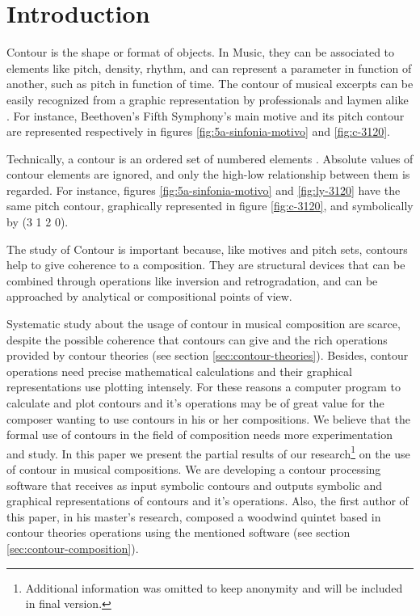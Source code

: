 

\section{Introduction}
\label{sec:introduction}
Contour is the shape or format of objects. In Music, they can be
associated to elements like pitch, density, rhythm, and can represent
a parameter in function of another, such as pitch in function of time.
The contour of musical excerpts can be easily recognized from a
graphic representation by professionals and laymen alike
\cite{marvin88:generalized}. For instance, Beethoven's Fifth
Symphony's main motive and its pitch contour are represented
respectively in figures \ref{fig:5a-sinfonia-motivo} and
\ref{fig:c-3120}.

Technically, a contour is an ordered set of numbered elements
\cite{morris93:directions}. Absolute values of contour elements are
ignored, and only the high-low relationship between them is
regarded. For instance, figures \ref{fig:5a-sinfonia-motivo} and
\ref{fig:ly-3120} have the same pitch contour, graphically represented
in figure \ref{fig:c-3120}, and symbolically by (3 1 2 0).

The study of Contour is important because, like motives and pitch
sets, contours help to give coherence to a composition. They are
structural devices that can be combined through operations like
inversion and retrogradation, and can be approached by analytical or
compositional points of view.

Systematic study about the usage of contour in musical composition are
scarce, despite the possible coherence that contours can give and the
rich operations provided by contour theories (see section
\ref{sec:contour-theories}). Besides, contour operations need precise
mathematical calculations and their graphical representations use
plotting intensely. For these reasons a computer program to calculate
and plot contours and it's operations may be of great value for the
composer wanting to use contours in his or her compositions. We
believe that the formal use of contours in the field of composition
needs more experimentation and study. In this paper we present the
partial results of our research\footnote{Additional information was
  omitted to keep anonymity and will be included in final version.} on
the use of contour in musical compositions. We are developing a
contour processing software that receives as input symbolic contours
and outputs symbolic and graphical representations of contours and
it's operations. Also, the first author of this paper, in his master's
research, composed a woodwind quintet based in contour theories
operations using the mentioned software (see section
\ref{sec:contour-composition}).

